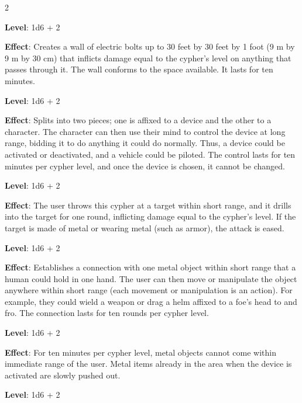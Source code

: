 \begin{multicols}{2}


\textbf{Level}: 1d6 + 2

\textbf{Effect}: Creates a wall of electric bolts up to 30 feet by 30 feet by 1 foot (9 m by 9 m by 30 cm) that inflicts damage equal to the cypher’s level on anything that passes through it. The wall conforms to the space available. It lasts for ten minutes.


\textbf{Level}: 1d6 + 2

\textbf{Effect}: Splits into two pieces; one is affixed to a device and the other to a character. The character can then use their mind to control the device at long range, bidding it to do anything it could do normally. Thus, a device could be activated or deactivated, and a vehicle could be piloted. The control lasts for ten minutes per cypher level, and once the device is chosen, it cannot be changed.


\textbf{Level}: 1d6 + 2

\textbf{Effect}: The user throws this cypher at a target within short range, and it drills into the target for one round, inflicting damage equal to the cypher’s level. If the target is made of metal or wearing metal (such as armor), the attack is eased.


\textbf{Level}: 1d6 + 2

\textbf{Effect}: Establishes a connection with one metal object within short range that a human could hold in one hand. The user can then move or manipulate the object anywhere within short range (each movement or manipulation is an action). For example, they could wield a weapon or drag a helm affixed to a foe’s head to and fro. The connection lasts for ten rounds per cypher level.


\textbf{Level}: 1d6 + 2

\textbf{Effect}: For ten minutes per cypher level, metal objects cannot come within immediate range of the user. Metal items already in the area when the device is activated are slowly pushed out.


\textbf{Level}: 1d6 + 2


\end{multicols}
